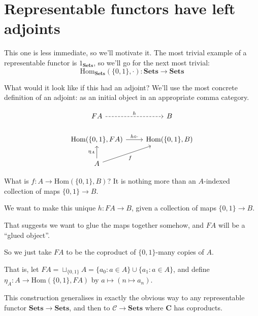 \documentclass[11pt]{amsart}
\begin{document}
\section{Representable functors have left adjoints}

This one is less immediate, so we'll motivate it.
The most trivial example of a representable functor is $1_{\mathbf{Sets}}$, so we'll go for the next most trivial: $$\text{Hom}_{\mathbf{Sets}}(\{0, 1\}, \cdot) : \mathbf{Sets} \to \mathbf{Sets}$$

What would it look like if this had an adjoint?
We'll use the most concrete definition of an adjoint: as an initial object in an appropriate comma category.

\[
\begin{tikzcd}
FA
    \arrow[r, dashrightarrow, "h"]
& B
\\
\mathrm{Hom}(\{0,1\}, FA)
    \arrow[r, "h \circ \cdot"]
& \mathrm{Hom}(\{0,1\}, B)
\\
A
    \arrow[u, "\eta_A"]
    \arrow[ur, "f"']
&
\end{tikzcd}
\]

What is $f: A \to \text{Hom}(\{0, 1\}, B)$?
It is nothing more than an $A$-indexed collection of maps $\{0, 1\} \to B$.

We want to make this unique $h: FA \to B$, given a collection of maps $\{0,1\} \to B$.

That suggests we want to glue the maps together somehow, and $FA$ will be a ``glued object''.

So we just take $FA$ to be the coproduct of $\{0,1\}$-many copies of $A$.

That is, let $FA = \sqcup_{\{0, 1\}} A = \{a_0: a \in A\} \cup \{a_1: a \in A\}$, and define $\eta_A: A \to \text{Hom}(\{0,1\}, FA)$ by $a \mapsto (n \mapsto a_n)$.

This construction generalises in exactly the obvious way to any representable functor $\mathbf{Sets} \to \mathbf{Sets}$, and then to $\mathcal{C} \to \mathbf{Sets}$ where $\mathbf{C}$ has coproducts.
\end{document}
